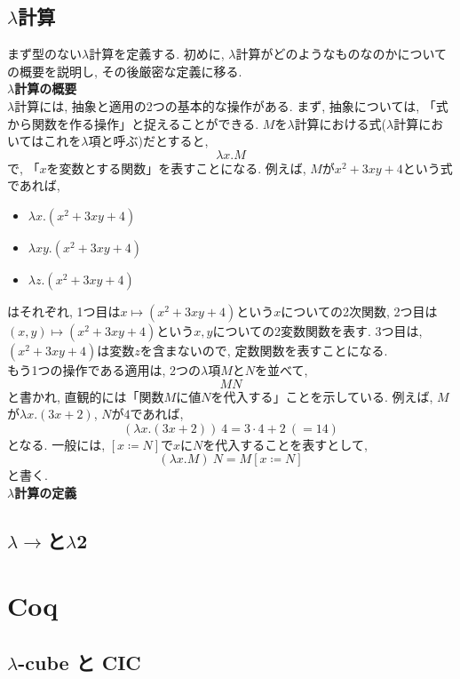 \documentclass[11pt]{jsreport}
\theoremstyle{mystyle}
\newcommand{\lama}{\lambda \! \! \to}
\newcommand{\0}{\textbf{0}}
\newcommand{\1}{\textbf{1}}
\newcommand{\2}{\textbf{2}}
\begin{document}
\subsection{$\lambda$計算} \label{ssec lambdacal}
まず型のない$\lambda$計算を定義する. 初めに, $\lambda$計算がどのようなものなのかについての概要を説明し, その後厳密な定義に移る. \\
\textbf{$\lambda$計算の概要}\\
$\lambda$計算には, 抽象と適用の2つの基本的な操作がある. まず, 抽象については, 「式から関数を作る操作」と捉えることができる. $M$を$\lambda$計算における式($\lambda$計算においてはこれを$\lambda$項と呼ぶ)だとすると, 
\[
  \lambda x . M
\]
で, 「$x$を変数とする関数」を表すことになる. 
例えば, $M$が$x^2 + 3xy + 4$という式であれば, 
\begin{itemize}
  \item $\lambda x . (x^2 + 3xy + 4)$
  \item $\lambda xy . (x^2 + 3xy + 4)$
  \item $\lambda z . (x^2 + 3xy + 4)$
\end{itemize}
はそれぞれ, 1つ目は$x \mapsto (x^2 + 3xy + 4)$という$x$についての2次関数, 
2つ目は$(x, y) \mapsto (x^2 + 3xy + 4)$という$x, y$についての2変数関数を表す. 
3つ目は, $(x^2 + 3xy + 4)$は変数$z$を含まないので, 定数関数を表すことになる. \\
もう1つの操作である適用は, 2つの$\lambda$項$M$と$N$を並べて, 
\[
  MN
\]
と書かれ, 直観的には「関数$M$に値$N$を代入する」ことを示している. 
例えば, $M$が$\lambda x . (3x + 2)$, $N$が$4$であれば, 
\[
  (\lambda x . (3x + 2))\ 4 = 3 \cdot 4 + 2\ (= 14)
\]
となる. 一般には, $[x \coloneqq N]$で$x$に$N$を代入することを表すとして, 
\[
  (\lambda x. M)\ N = M[x\coloneqq N]
\]
と書く. \\
\textbf{$\lambda$計算の定義}
\subsection{$\lama$と$\lambda$2}
\section{Coq} \label{sec coq}
\subsection{$\lambda$-cube と CIC}
\end{document}
